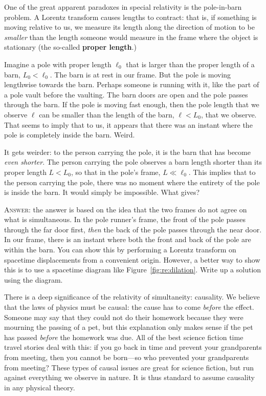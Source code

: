 \documentclass[12pt, oneside]{report}    %
\begin{document}
\begin{exercise}
One of the great apparent paradoxes in special relativity is the pole-in-barn problem. A Lorentz transform causes lengths to contract: that is, if something is moving relative to us, we measure its length along the direction of motion to be \emph{smaller} than the length someone would measure in the frame where the object is stationary (the so-called \textbf{proper length}.)

Imagine a pole with proper length $\ell_0$ that is larger than the proper length of a barn, $L_0 < \ell_0$. The barn is at rest in our frame. But the pole is moving lengthwise towards the barn. Perhaps someone is running with it, like the part of a pole vault before the vaulting. The barn doors are open and the pole passes through the barn. If the pole is moving fast enough, then the pole length that we observe $\ell$ can be smaller than the length of the barn, $\ell < L_0$, that we observe. That seems to imply that to us, it appears that there was an instant where the pole is completely inside the barn. Weird.

It gets weirder: to the person carrying the pole, it is the barn that has become \emph{even shorter}. The person carrying the pole observes a barn length shorter than its proper length $L < L_0$, so that in the pole's frame, $L \ll \ell_0$.  This implies that to the person carrying the pole, there was no moment where the entirety of the pole is inside the barn. It would simply be impossible. What gives?

\textsc{Answer:} the answer is based on the idea that the two frames do not agree on what is simultaneous. In the pole runner's frame, the front of the pole passes through the far door first, \emph{then} the back of the pole passes through the near door. In our frame, there is an instant where both the front and back of the pole are within the barn. You can show this by performing a Lorentz transform on spacetime displacements from a convenient origin. However, a better way to show this is to use a spacetime diagram like Figure~\ref{fig:re:dilation}. Write up a solution using the diagram.
\end{exercise}

There is a deep significance of the relativity of simultaneity: causality. We believe that the laws of physics must be causal: the cause has to come \emph{before} the effect. Someone may say that they could not do their homework because they were mourning the passing of a pet, but this explanation only makes sense if the pet has passed \emph{before} the homework was due. All of the best science fiction time travel stories deal with this: if you go back in time and prevent your grandparents from meeting, then you cannot be born---so who prevented your grandparents from meeting? These types of causal issues are great for science fiction, but run against everything we observe in nature. It is thus standard to assume causality in any physical theory.
\end{document}
